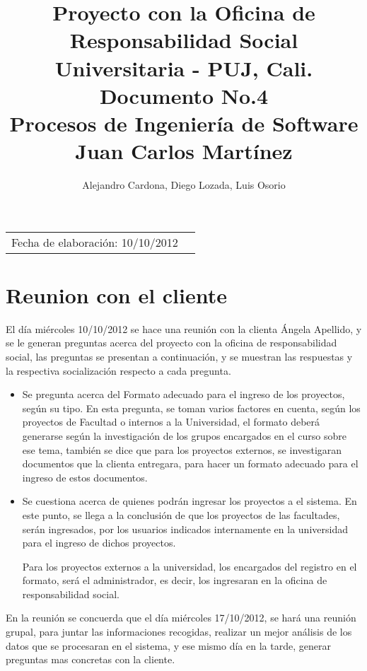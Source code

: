 \documentclass{article}
\title{Proyecto con la Oficina de Responsabilidad Social Universitaria - PUJ, Cali. \\ Documento No.4\\ Procesos de Ingenier\'ia de Software \\ Juan Carlos Mart\'inez \\ } %
\author{Alejandro Cardona, Diego Lozada, Luis Osorio} %
\begin{document}
\maketitle %

\begin{tabular}{lr}
Fecha de elaboraci\'on: 10/10/2012 
\end{tabular}

\setlength\parindent{0pt} %

\section{Reunion con el cliente}

El d\'ia mi\'ercoles 10/10/2012 se hace una reuni\'on con la clienta \'Angela Apellido, y se le generan preguntas acerca del proyecto con la oficina de responsabilidad social, las preguntas se presentan a continuaci\'on, y se muestran las respuestas y la respectiva socializaci\'on respecto a cada pregunta.

\begin{itemize}

\item Se pregunta acerca del Formato adecuado para el ingreso de los proyectos, seg\'un su tipo. En esta pregunta, se toman varios factores en cuenta, seg\'un los proyectos de Facultad o internos a la Universidad, el formato deber\'a generarse seg\'un la investigaci\'on de los grupos encargados en el curso sobre ese tema, tambi\'en se dice que para los proyectos externos, se investigaran documentos que la clienta entregara, para hacer un formato adecuado para el ingreso de estos documentos.

\item Se cuestiona acerca de quienes podr\'an ingresar los proyectos a el sistema. En este punto, se llega a la conclusi\'on de que los proyectos de las facultades, ser\'an ingresados, por los usuarios indicados internamente en la universidad para el ingreso de dichos proyectos.

Para los proyectos externos a la universidad, los encargados del registro en el formato, ser\'a el administrador, es decir, los ingresaran en la oficina de responsabilidad social.
\end{itemize}

En la reuni\'on se concuerda que el d\'ia mi\'ercoles 17/10/2012, se har\'a una reuni\'on grupal, para juntar las informaciones recogidas, realizar un mejor an\'alisis de los datos que se procesaran en el sistema, y ese mismo d\'ia en la tarde, generar preguntas mas concretas con la cliente. 
\end{document}
